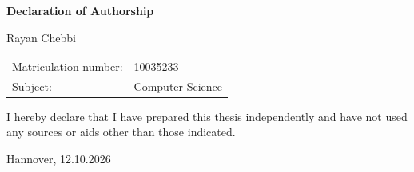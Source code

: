 \clearpage
\thispagestyle{empty}

\vspace*{2.2cm}

\noindent
{\Huge\bfseries Declaration of Authorship}

\vspace{2.2cm}

\noindent
{\Large Rayan Chebbi}

\vspace{1.2cm}

\noindent
\begin{tabular}{@{}p{5.5cm}p{7cm}@{}}
Matriculation number: & 10035233 \\
Subject: & Computer Science
\end{tabular}

\vspace{4.0cm}

\noindent
\begin{minipage}{0.85\textwidth}
\Large
I hereby declare that I have prepared this thesis independently and have not used any
sources or aids other than those indicated.
\end{minipage}

\vspace{2.2cm}

\noindent
{\Large Hannover, 12.10.2026}

\clearpage
